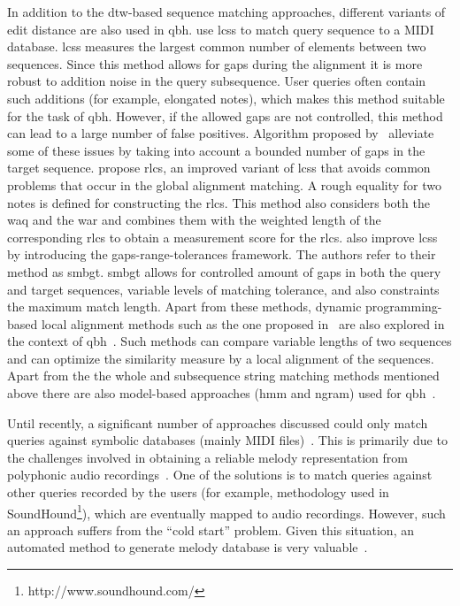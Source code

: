 In addition to the \gls{dtw}-based sequence matching approaches, different variants of edit distance are also used in \gls{qbh}. \cite{uitdenbogerd1999melodic} use \gls{lcss} to match query sequence to a MIDI database. \gls{lcss} measures the largest common number of elements between two sequences. Since this method allows for gaps during the alignment it is more robust to addition noise in the query subsequence. User queries often contain such additions (for example, elongated notes), which makes this method suitable for the task of \gls{qbh}. However, if the allowed gaps are not controlled, this method can lead to a large number of false positives. Algorithm proposed by~\cite{iliopoulos2002string} alleviate some of these issues by taking into account a bounded number of gaps in the target sequence. \cite{lin2011music} propose \gls{rlcs}, an improved variant of \gls{lcss} that avoids common problems that occur in the global alignment matching. A rough equality for two notes is defined for constructing the \gls{rlcs}. This method also considers both the \gls{waq} and the \gls{war} and combines them with the weighted length of the corresponding \gls{rlcs} to obtain a measurement score for the \gls{rlcs}. \cite{kotsifakos2011subsequence} also improve \gls{lcss} by introducing the gaps-range-tolerances framework. The authors refer to their method as \gls{smbgt}. \gls{smbgt} allows for controlled amount of gaps in both the query and target sequences, variable levels of matching tolerance, and also constraints the maximum match length. Apart from these methods, dynamic programming-based local alignment methods such as the one proposed in~\cite{smith1981identification} are also explored in the context of \gls{qbh}~\citep{uitdenbogerd1999melodic}. Such methods can compare variable lengths of two sequences and can optimize the similarity measure by a local alignment of the sequences. Apart from the the whole and subsequence string matching methods mentioned above there are also model-based approaches (\acrshort{hmm} and \acrshort{ngram}) used for \gls{qbh}~\citep{durey2001melody,jang2005continuous,uitdenbogerd1999melodic,dannenberg2007comparative}. 

Until recently, a significant number of approaches discussed could only match queries against symbolic databases (mainly MIDI files)~\citep{kotsifakos2012survey}. This is primarily due to the challenges involved in obtaining a reliable melody representation from polyphonic audio recordings~\citep{salamon2013tonal}. One of the solutions is to match queries against other queries recorded by the users (for example, methodology used in SoundHound\footnote{http://www.soundhound.com/}), which are eventually mapped to audio recordings. However, such an approach suffers from the ``cold start'' problem. Given this situation, an automated method to generate melody database is very valuable~\citep{salamon2013tonal}. 

